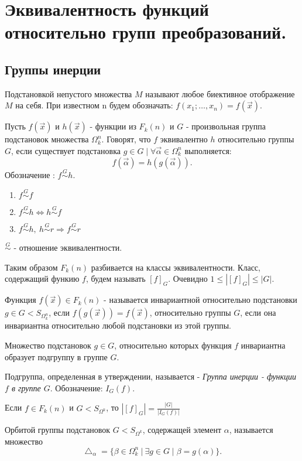 \section{Эквивалентность функций относительно групп преобразований.}

\subsection{Группы инерции}

\opr Подстановкой непустого множества $M$ называют любое биективное отображение $M$ на себя.
При известном n будем обозначать: $f(x_1; \ldots, x_n)=f(\vec{x})$.

\opr Пусть $f(\vec{x})$ и $h(\vec{x})$ - функции из $F_k(n)$ и $G$ - произвольная группа подстановок множества $\Omega_k^n$.
Говорят, что $f$ эквивалентно $h$ относительно группы $G$, если существует подстановка $g \in G \mid \forall \vec{\alpha} \in \Omega_k^n$ выполняется:
$$
f(\vec{\alpha})=h(g(\vec{\alpha})).
$$
Обозначение : $f \stackrel{G}{\sim} h$.
 
\utv
\begin{enumerate}
  \item $f \stackrel{G}{\sim} f$
  \item $f \stackrel{G}{\sim} h \Leftrightarrow h \stackrel{G}{\sim} f$
  \item $f \stackrel{G}{\sim} h, \  h \stackrel{G}{\sim} r \Rightarrow f \stackrel{G}{\sim} r$
\end{enumerate}

$\stackrel{G}{\sim}$ - отношение эквивалентности.

Таким образом $F_k(n)$ разбивается на классы эквивалентности. Класс, содержащий функию $f$, будем называть $[f]_G$.
Очевидно $1 \leq |[f]_G|\leq|G|$.

\opr Функция $f(\vec{x}) \in F_k(n) $ - называется инвариантной относительно подстановки $g \in G < S_{\Omega_k^n}$,
если $f(g(\vec{x})) = f(\vec{x})$, относительно группы $G$, если она инвариантна относительно любой подстановки из этой группы.

\utv Множество подстановок $g \in G$, относительно которых функция $f$ инвариантна образует подгруппу в группе $G$.

\opr Подгруппа, определенная в утверждении, называется - \emph{Группа инерции - функции $f$ в группе $G$}. Обозначение: $I_G(f)$.

\thr Если $f\in F_k(n)$ и $G < S_{\Omega^k}$, то $|[f]_G|=\frac{|G|}{|I_G(f)|}$

\opr Орбитой группы подстановок $G < S_{\Omega^k}$, содержащей элемент $\alpha$, называется множество
$$
\bigtriangleup_\alpha = \{ \beta \in \Omega_k^n\: |\:  \exists g\in G \mid \beta =g(\alpha)\}.
$$

